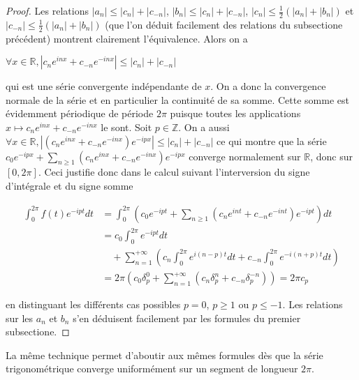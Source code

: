 \begin{proof}
Les relations
$|a_n| \leq |c_n| + |c_{-n}|$, 
$|b_n| \leq |c_n| + |c_{-n}|$,
$|c_n| \leq \frac{1}{2} (|a_n| + |b_n|)$ et
$|c_{-n}| \leq \frac{1}{2} (|a_n| + |b_n|)$
(que l'on déduit facilement des relations du subsectione précédent)
montrent clairement l'équivalence. Alors on a

$\forall x \in \mathbb{R}, |c_n e^{inx} + c_{-n} e^{-inx}| \leq |c_n| + |c_{-n}|$

qui est une série convergente indépendante de $x$. On a donc la
convergence normale de la série et en particulier la continuité de sa
somme. Cette somme est évidemment périodique de période $2\pi$ puisque
toutes les applications
$x \mapsto c_n e^{inx} + c_{-n} e^{-inx}$ le sont. Soit $p \in \mathbb{Z}$. On a aussi
$\forall x \in \mathbb{R},
|(c_n e^{inx} + c_{-n} e^{-inx}) e^{-ipx}| \leq |c_n| + |c_{-n}|$ ce qui montre que la série
$c_0 e^{-ipx} + \sum_{n \geq 1} (c_n e^{inx} + c_{-n} e^{-inx}) e^{-ipx}$ converge normalement
sur $\mathbb{R}$, donc sur $[0,2\pi]$. Ceci justifie donc dans le calcul suivant
l'interversion du signe d'intégrale et du signe somme

\begin{align*} 
\int_0^{2\pi} f(t) e^{-ipt} dt 
&= \int_0^{2\pi} \left(c_0 e^{-ipt} + \sum_{n \geq 1} (c_n e^{int} + c_{-n} e^{-int}) e^{-ipt} \right) dt \\
&= c_0 \int_0^{2\pi} e^{-ipt} dt \\
&\quad + \sum_{n=1}^{+\infty} \left(c_n \int_0^{2\pi} e^{i(n-p)t} dt + c_{-n} \int_0^{2\pi} e^{-i(n+p)t} dt \right) \\
&= 2\pi \left(c_0 \delta_p^0 + \sum_{n=1}^{+\infty} (c_n \delta_p^n + c_{-n} \delta_p^{-n}) \right) = 2\pi c_p
\end{align*}

en distinguant les différents cas possibles $p = 0$, $p \geq 1$ ou $p \leq -1$. Les
relations sur les $a_n$ et $b_n$ s'en déduisent facilement
par les formules du premier subsectione.  
\end{proof}

\begin{rem}
La même technique permet d'aboutir aux mêmes formules
dès que la série trigonométrique converge uniformément sur un segment de
longueur $2\pi$.
\end{rem}